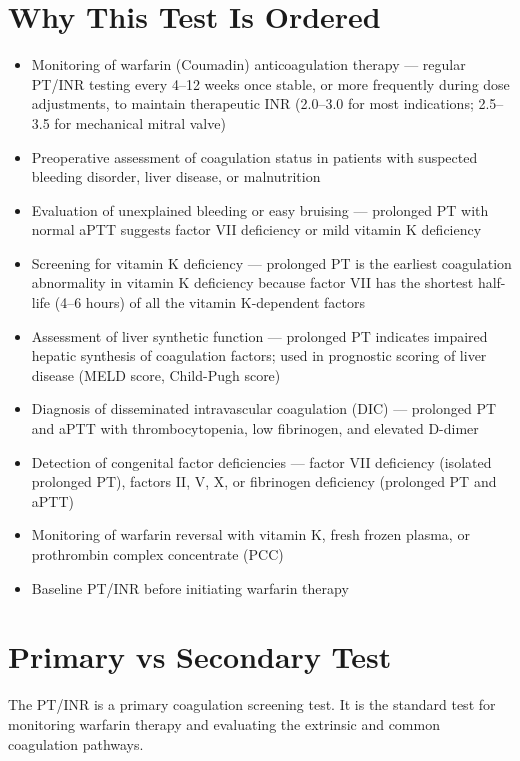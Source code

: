 \section*{Why This Test Is Ordered}
\begin{itemize}
  \item Monitoring of warfarin (Coumadin) anticoagulation therapy --- regular PT/INR testing every 4--12 weeks once stable, or more frequently during dose adjustments, to maintain therapeutic INR (2.0--3.0 for most indications; 2.5--3.5 for mechanical mitral valve)
  \item Preoperative assessment of coagulation status in patients with suspected bleeding disorder, liver disease, or malnutrition
  \item Evaluation of unexplained bleeding or easy bruising --- prolonged PT with normal aPTT suggests factor VII deficiency or mild vitamin K deficiency
  \item Screening for vitamin K deficiency --- prolonged PT is the earliest coagulation abnormality in vitamin K deficiency because factor VII has the shortest half-life (4--6 hours) of all the vitamin K-dependent factors
  \item Assessment of liver synthetic function --- prolonged PT indicates impaired hepatic synthesis of coagulation factors; used in prognostic scoring of liver disease (MELD score, Child-Pugh score)
  \item Diagnosis of disseminated intravascular coagulation (DIC) --- prolonged PT and aPTT with thrombocytopenia, low fibrinogen, and elevated D-dimer
  \item Detection of congenital factor deficiencies --- factor VII deficiency (isolated prolonged PT), factors II, V, X, or fibrinogen deficiency (prolonged PT and aPTT)
  \item Monitoring of warfarin reversal with vitamin K, fresh frozen plasma, or prothrombin complex concentrate (PCC)
  \item Baseline PT/INR before initiating warfarin therapy
\end{itemize}

\section*{Primary vs Secondary Test}
The PT/INR is a primary coagulation screening test. It is the standard test for monitoring warfarin therapy and evaluating the extrinsic and common coagulation pathways.

